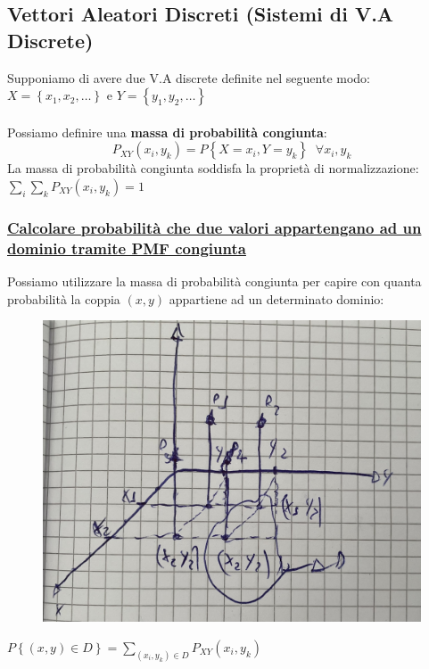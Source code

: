 \documentclass{article}
\begin{document}
\subsection{Vettori Aleatori Discreti (Sistemi di V.A Discrete)}
Supponiamo di avere due V.A discrete definite nel seguente modo: \\
$X = \left\{x_1,x_2, \dots \right\}$ e $Y = \left\{y_1,y_2, \dots \right\}$ \\ \\
Possiamo definire una \textbf{massa di probabilità congiunta}:
\[P_{XY}(x_i,y_k) = P \left\{X = x_i, Y = y_k\right\} \;\; \forall x_i,y_k\]
La massa di probabilità congiunta soddisfa la proprietà di normalizzazione: $\sum_{i} \sum_{k} P_{XY}(x_i,y_k) = 1$
\subsubsection{\underline{Calcolare probabilità che due valori appartengano ad un dominio tramite PMF congiunta}}
Possiamo utilizzare la massa di probabilità congiunta per capire con quanta probabilità la coppia $(x,y)$ appartiene ad un determinato dominio:
\begin{figure}[H]
\centering
\includegraphics[scale=0.16]{images/74.VettAleaDisc1.jpeg}
\end{figure} 
$P \left\{(x,y) \in D \right\} = \sum_{(x_i,y_k) \in D} P_{XY}(x_i, y_k)$
\end{document}
